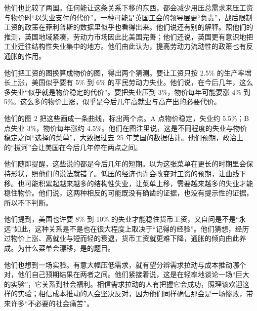 他们也比较了两国\cite{samuelson1960}。任何能让这条关系下移的东西，都会减少用压总需求来压工资与物价时“以失业支付的代价”\cite{samuelson1960}。一种可能是英国工会的领导层更“负责”，战后限制工资的政策在菲利普斯的数据里似乎也看得出来\cite{samuelson1960}。他们说还有别的解释。照他们的推测，英国地域紧凑，劳动力市场因此比美国完善；他们还说，英国更有意识地把工业迁往结构性失业集中的地方\cite{samuelson1960}。他们由此认为，提高劳动力流动性的政策也有反通胀的作用\cite{samuelson1960}。

他们把工资的图换算成物价的图，得出两个猜测\cite{samuelson1960}。要让工资只按 2.5\% 的生产率增长上涨，美国似乎要有 5\% 到 6\% 的平民劳动力失业\cite{samuelson1960}。他们说，在今后几年，这么多失业“似乎就是物价稳定的代价”\cite{samuelson1960}。要把失业压到 3\%，物价每年可能要涨 4\% 到 5\%\cite{samuelson1960}。这么多的物价上涨，似乎是今后几年高就业与高产出的必要代价\cite{samuelson1960}。

他们的图 2 把这些画成一条曲线，标出两个点\cite{samuelson1960}。A 点物价稳定，失业约 5.5\%；B 点失业 3\%，物价每年涨约 4.5\%\cite{samuelson1960}。他们在图注里说，这是不同程度的失业与物价稳定之间“选择的菜单”，大致据过去 25 年美国的数据估计\cite{samuelson1960}。他们预期，政治上的“拔河”会让美国在今后几年停在两点之间\cite{samuelson1960}。

他们随即提醒，这些说的都是今后几年的短期\cite{samuelson1960}。以为这张菜单在更长的时期里会保持形状，照他们的说法就错了\cite{samuelson1960}。低压的经济也许会改变对工资的预期，让曲线下移\cite{samuelson1960}。也可能积累起越来越多的结构性失业，让菜单上移，需要越来越多的失业才能稳住物价\cite{samuelson1960}。他们说，这两种相反的可能既没有确凿的证据，也没有提示性的证据，所以不下判断\cite{samuelson1960}。

他们提到，美国也许要 8\% 到 10\% 的失业才能稳住货币工资，又自问是不是“永远”如此，这种关系是不是也在很大程度上取决于“记得的经验”\cite{samuelson1960}。他们猜想，经历过物价上涨、高就业与短而轻的衰退，货币工资就更难下降，通胀的倾向由此养成\cite{samuelson1960}。为什么菜单会漂移，是的题目。

他们也想到一场实验\cite{samuelson1960}。有意大幅压低需求，就有望分辨需求拉动与成本推动哪个对，他们自己预期结果在两者之间\cite{samuelson1960}。他们紧接着说，这是在轻率地谈论一场“巨大的实验”，它关系到社会福利\cite{samuelson1960}。相信需求拉动的人有把握它会成功，照理该欢迎这样的实验；相信成本推动的人会坚决反对，因为他们同样确信那会是一场惨败，带来许多“不必要的社会痛苦”\cite{samuelson1960}。

